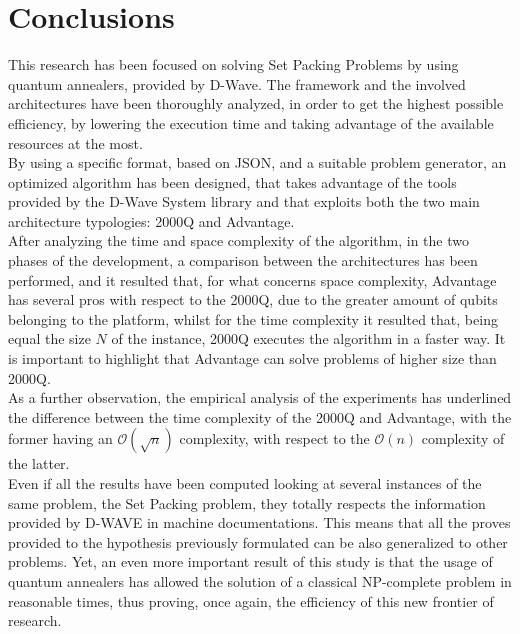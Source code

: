 \documentclass[oneside,a4paper]{article}
\begin{document}
\section{Conclusions}
This research has been focused on solving Set Packing Problems by using quantum annealers, provided by D-Wave. The framework and the involved architectures have been thoroughly analyzed, in order to get the highest possible efficiency, by lowering the execution time and taking advantage of the available resources at the most. 
\\
By using a specific format, based on JSON, and a suitable problem generator, an optimized algorithm has been designed, that takes advantage of the tools provided by the D-Wave System library and that exploits both the two main architecture typologies: 2000Q and Advantage.
\\
After analyzing the time and space complexity of the algorithm, in the two phases of the development, a comparison between the architectures has been performed, and it resulted that, for what concerns space complexity, Advantage has several pros with respect to the 2000Q, due to the greater amount of qubits belonging to the platform, whilst for the time complexity it resulted that, being equal the size $N$ of the instance, 2000Q executes the algorithm in a faster way. It is important to highlight that Advantage can solve problems of higher size than 2000Q.
\\
As a further observation, the empirical analysis of the experiments has underlined the difference between the time complexity of the 2000Q and Advantage, with the former having an $\mathcal{O}(\sqrt{n})$ complexity, with respect to the $\mathcal{O}(n)$ complexity of the latter.
\\
Even if all the results have been computed looking at several instances of the same problem, the Set Packing problem, they totally respects the information provided by D-WAVE in machine documentations. This means that all the proves provided to the hypothesis previously formulated can be also generalized to other problems. Yet, an even more important result of this study is that the usage of quantum annealers has allowed the solution of a classical NP-complete problem in reasonable times, thus proving, once again, the efficiency of this new frontier of research.



\end{document}
